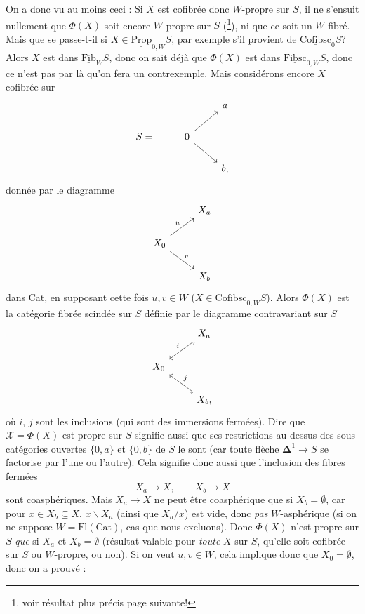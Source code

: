 \documentclass[11pt]{article}
\newcommand{\printedpage}[1]{\marginpar{\footnotesize p.~#1}}
\newcommand{\msp}[1]{\marginpar{\footnotesize [#1]}}
\newcommand{\Fib}{\underline{\mathrm{Fib}}}
\newcommand{\Prop}{\underline{\mathrm{Prop}}}
\newcommand{\Fibsc}{\underline{\mathrm{Fibsc}}}
\newcommand{\Cofibsc}{\underline{\mathrm{Cofibsc}}}
\newcommand{\margbar}{\marginpar{\(\|\)}}
\begin{document}
\printedpage{118}
\msp{page 191}
\margbar On a donc vu au moins ceci : Si $X$ est cofibrée donc $W$-propre sur $S$, il ne s'ensuit nullement que $\Phi(X)$ soit encore $W$-propre sur $S$ (\footnote{voir résultat plus précis page suivante!}), ni que ce soit un $W$-fibré. Mais que se passe-t-il si $X \in \Prop_{0,W}S$, par exemple s'il provient de $\Cofibsc_0 S$? Alors $X$ est dans $\Fib_W S$, donc on sait déjà que $\Phi(X)$ est dans $\Fibsc_{0,W}S$, donc ce n'est pas par là qu'on fera un contrexemple. Mais considérons encore $X$ cofibrée sur
\[
\begin{tikzcd}
 & & a \\
S = & 0 \arrow[ur] \arrow[dr] & \\
 & & b,
\end{tikzcd}
\]
donnée par le diagramme
\[
\begin{tikzcd}
 & X_a \\
X_0 \arrow[ur, "u"] \arrow[dr, "v"] & \\
 & X_b
\end{tikzcd}
\]
dans Cat, en supposant cette fois $u, v \in W$ ($X \in \Cofibsc_{0,W}S$). Alors $\Phi(X)$ est la catégorie fibrée scindée sur $S$ définie par le diagramme contravariant sur $S$
\[
\begin{tikzcd}
 & X_a \arrow[dl, hook, "i"'] \\
X_0 & \\
 & X_b, \arrow[ul, hook, "j"']
\end{tikzcd}
\]
où $i$, $j$ sont les inclusions (qui sont des immersions fermées). Dire que $\mathcal{X} = \Phi(X)$ est propre sur $S$ signifie aussi que ses restrictions au dessus des sous-catégories ouvertes $\{0,a\}$ et $\{0,b\}$ de $S$ le sont (car toute flèche $\mathbf{\Delta}^1 \longrightarrow S$ se factorise par l'une ou l'autre). Cela
\msp{page 192}
signifie donc aussi que l'inclusion des fibres fermées
\[ X_a \longrightarrow X, \qquad X_b \longrightarrow X \]
sont coasphériques. Mais $X_a \longrightarrow X$ ne peut être coasphérique que si $X_b = \emptyset$, car pour $x \in X_b \subseteq X$, $x\backslash X_a$ (ainsi que $X_a/x$) est vide, donc \textit{pas} $W$-asphérique (si on ne suppose $W = \mathrm{Fl}(\mathrm{Cat})$, cas que nous excluons). Donc $\Phi(X)$ n'est propre sur $S$ \textit{que} si $X_a$ et $X_b = \emptyset$ (résultat valable pour \textit{toute} $X$ sur $S$, qu'elle soit cofibrée sur $S$ ou $W$-propre, ou non). Si on veut $u, v \in W$, cela implique donc que $X_0 = \emptyset$, donc on a prouvé :

\printedpage{119}
\end{document}
